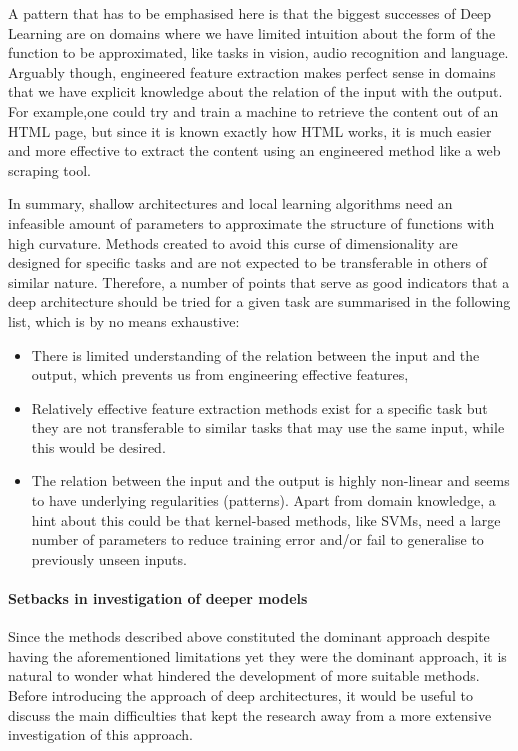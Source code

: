 \documentclass[a4paper]{article}
\begin{document}
		A pattern that has to be emphasised here is that the biggest successes of Deep Learning are on domains where we have limited intuition about the form of the function to be approximated, like tasks in vision, audio recognition and language. Arguably though, engineered feature extraction makes perfect sense in domains that we have explicit knowledge about the relation of the input with the output. For example,one could try and train a machine to retrieve the content out of an HTML page, but since it is known exactly how HTML works, it is much easier and more effective to extract the content using an engineered method like a web scraping tool.
	
	In summary, shallow architectures and local learning algorithms need an infeasible amount of parameters to approximate the structure of functions with high curvature. Methods created to avoid this curse of dimensionality are designed for specific tasks and are not expected to be transferable in others of similar nature. Therefore, a number of points that serve as good indicators that a deep architecture should be tried for a given task are summarised in the following list, which is by no means exhaustive: 
	\begin{itemize}
		\item There is limited understanding of the relation between the input and the output, which prevents us from engineering effective features,
		\item Relatively effective feature extraction methods exist for a specific task but they are not transferable to similar tasks that may use the same input, while this would be desired.
		\item The relation between the input and the output is highly non-linear and seems to have underlying regularities (patterns). Apart from domain knowledge, a hint about this could be that kernel-based methods, like SVMs, need a large number of parameters to reduce training error and/or fail to generalise to previously unseen inputs.
	\end{itemize}
	\paragraph{Setbacks in investigation of deeper models}
	Since the methods described above constituted the dominant approach despite having the aforementioned limitations yet they were the dominant approach, it is natural to wonder what hindered the development of more suitable methods. Before introducing the approach of deep architectures, it would be useful to discuss the main difficulties that kept the research away from a more extensive investigation of this approach.
	
\end{document}
